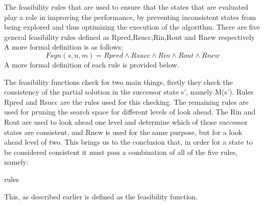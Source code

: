 The feasibility rules that are used to ensure that the states that are evaluated play a role in improving the performance, by preventing inconsistent states from being explored and thus optimizing the execution of the algorithm. There are five general feasibility rules defined as R{\tiny pred},R{\tiny succ},R{\tiny in},R{\tiny out} and R{\tiny new} respectively A more formal definition is as follows:
	\begin{equation}
		Fsyn(s,n,m) = Rpred \wedge Rsucc \wedge Rin \wedge Rout \wedge Rnew 
	\end{equation} 
 A more formal definition of each rule is provided below.

The feasibility functions check for two main things, firstly they check the consistency of the partial solution in the successor state s', namely M(s'). Rules R{\tiny pred} and R{\tiny succ} are the rules used for this checking.
The remaining rules are used for pruning the search space for different levels of look ahead. The R{\tiny in} and R{\tiny out} are used to look ahead one level and determine which of those successor states are consistent, and R{\tiny new} is used for the same purpose, but for a look ahead level of two. This brings us to the conclusion that, in order for a state to be considered consistent it must pass a combination of all of the five rules, namely:


{rules}


This, as described earlier is defined as the feasibility function.